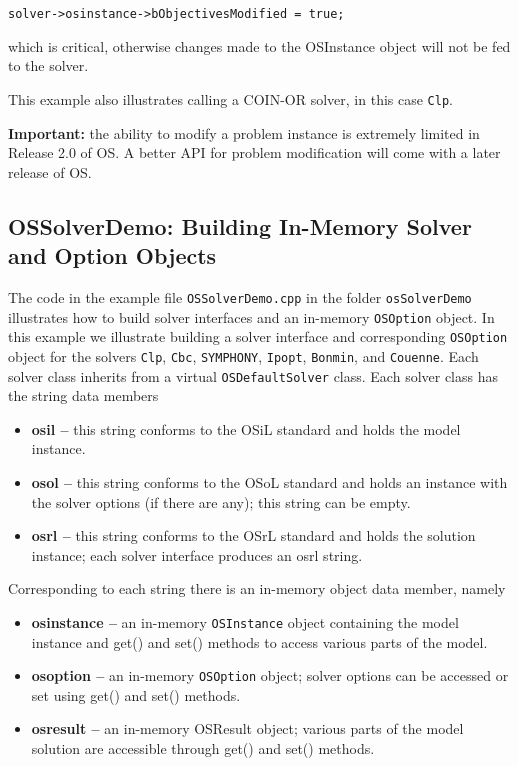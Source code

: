 \documentclass[11pt]{article}
\renewcommand{\_}{{\char"5F}}
\renewcommand{\{}{{\char"7B}}
\renewcommand{\}}{{\char"7D}}
\renewcommand{\^}{{\char"0D}}
\renewcommand{\'}{{\char"0D}}
\begin{document}
\begin{verbatim}
solver->osinstance->bObjectivesModified = true;
\end{verbatim}
which is critical, otherwise changes made to the OSInstance object will not be fed to the solver. 

This example also illustrates calling a COIN-OR solver,
in this case {\tt Clp}.

\vskip 8pt

{\bf Important:} the ability to modify a problem instance is extremely limited in Release 2.0 of OS. A better API for problem modification will come with a later release of OS.



\subsection{OSSolverDemo: Building In-Memory Solver and Option Objects}\label{section:exampleOSSolverDemo}

The code in the  example file {\tt OSSolverDemo.cpp} in the folder {\tt osSolverDemo}  illustrates  how to build solver interfaces and  an in-memory {\tt OSOption} object. In this example we  illustrate building a solver interface and corresponding {\tt OSOption} object for the solvers {\tt Clp}, {\tt Cbc}, {\tt SYMPHONY}, {\tt Ipopt},   {\tt Bonmin}, and {\tt Couenne}.   Each solver class inherits from a virtual {\tt OSDefaultSolver} class. Each solver class has the string data members

\begin{itemize}
\item {\bf osil --} this string conforms to the OSiL standard and holds the model instance.

\item {\bf osol --} this string conforms to the OSoL standard and holds an instance with the 
solver options (if there are any); this string can be empty.

\item {\bf osrl --} this string conforms to the OSrL standard and holds the solution instance; 
each solver interface produces an osrl string.
\end{itemize}

Corresponding to each string there is an in-memory object data member, namely

\begin{itemize}
\item {\bf osinstance --}  an in-memory {\tt OSInstance} object containing the model instance
and get() and set() methods to access various parts of the model.


\item {\bf osoption --} an in-memory {\tt OSOption} object; solver options can be accessed or 
set using get() and set() methods.


\item {\bf osresult --}  an in-memory OSResult object; various parts of the model solution  
are accessible through get() and set() methods.
\end{itemize}
\end{document}
